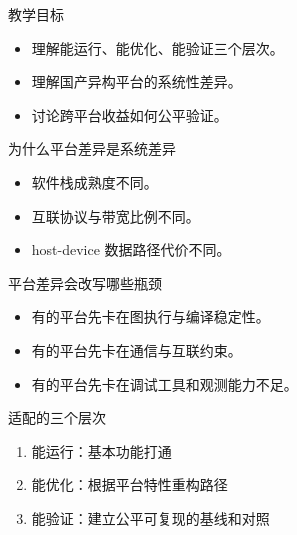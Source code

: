 




\begin{frame}[plain]
  \titlepage
\end{frame}

\begin{frame}{教学目标}
  \begin{itemize}
    \item 理解能运行、能优化、能验证三个层次。
    \item 理解国产异构平台的系统性差异。
    \item 讨论跨平台收益如何公平验证。
  \end{itemize}
\end{frame}

\begin{frame}{为什么平台差异是系统差异}
  \begin{itemize}
    \item 软件栈成熟度不同。
    \item 互联协议与带宽比例不同。
    \item host-device 数据路径代价不同。
  \end{itemize}
\end{frame}

\begin{frame}{平台差异会改写哪些瓶颈}
  \begin{itemize}
    \item 有的平台先卡在图执行与编译稳定性。
    \item 有的平台先卡在通信与互联约束。
    \item 有的平台先卡在调试工具和观测能力不足。
  \end{itemize}
\end{frame}

\begin{frame}{适配的三个层次}
  \begin{enumerate}
    \item 能运行：基本功能打通
    \item 能优化：根据平台特性重构路径
    \item 能验证：建立公平可复现的基线和对照
  \end{enumerate}
\end{frame}

